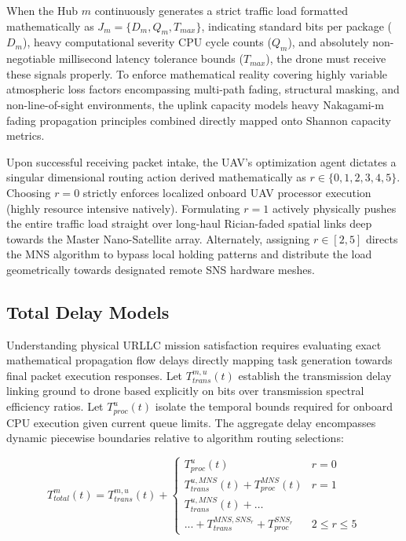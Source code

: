 \documentclass[conference]{IEEEtran}
\begin{document}
When the Hub $m$ continuously generates a strict traffic load formatted mathematically as $J_m = \{D_m, Q_m, T_{max}\}$, indicating standard bits per package ($D_m$), heavy computational severity CPU cycle counts ($Q_m$), and absolutely non-negotiable millisecond latency tolerance bounds ($T_{max}$), the drone must receive these signals properly. To enforce mathematical reality covering highly variable atmospheric loss factors encompassing multi-path fading, structural masking, and non-line-of-sight environments, the uplink capacity models heavy Nakagami-m fading propagation principles combined directly mapped onto Shannon capacity metrics.

Upon successful receiving packet intake, the UAV's optimization agent dictates a singular dimensional routing action derived mathematically as $r \in \{0, 1, 2, 3, 4, 5\}$. Choosing $r=0$ strictly enforces localized onboard UAV processor execution (highly resource intensive natively). Formulating $r=1$ actively physically pushes the entire traffic load straight over long-haul Rician-faded spatial links deep towards the Master Nano-Satellite array. Alternately, assigning $r \in [2,5]$ directs the MNS algorithm to bypass local holding patterns and distribute the load geometrically towards designated remote SNS hardware meshes.

\subsection{Total Delay Models}
Understanding physical URLLC mission satisfaction requires evaluating exact mathematical propagation flow delays directly mapping task generation towards final packet execution responses. Let $T_{trans}^{m,u}(t)$ establish the transmission delay linking ground to drone based explicitly on bits over transmission spectral efficiency ratios. Let $T_{proc}^{u}(t)$ isolate the temporal bounds required for onboard CPU execution given current queue limits. The aggregate delay encompasses dynamic piecewise boundaries relative to algorithm routing selections:

\begin{equation} \label{eq:delay}
T_{total}^{m}(t) = T_{trans}^{m,u}(t) + \begin{cases} 
      T_{proc}^{u}(t) & r = 0 \\
      T_{trans}^{u,MNS}(t) + T_{proc}^{MNS}(t) & r = 1 \\
      T_{trans}^{u,MNS}(t) + \dots \\
      ... + T_{trans}^{MNS,SNS_{r}} + T_{proc}^{SNS_{r}} & 2 \leq r \leq 5 
   \end{cases}
\end{equation}
\end{document}
